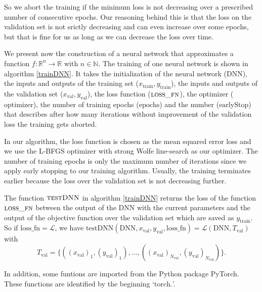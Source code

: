 So we abort the training if the minimum loss is not decreasing over a prescribed number of consecutive epochs. Our reasoning behind this is that the loss on the validation set is not srictly decreasing and can even increase over some epochs, but that is fine for us as long as we can decrease the loss over time.

We present now the construction of a neural network that approximates a function $f:\mathbb{R}^n\to\mathbb{R}$ with $n\in\mathbb{N}$. The training of one neural network is shown in algorithm \ref{trainDNN}. It takes the initialization of the neural network ($\mathrm{DNN}$), the inputs and outputs of the training set ($x_\mathrm{train}, y_\mathrm{train}$), the inputs and outputs of the validation set ($x_\mathrm{val}, y_\mathrm{val}$), the loss function ($\textproc{loss\_fn}$), the optimizer ($\mathrm{optimizer}$), the number of training epochs ($\mathrm{epochs}$) and the number ($\mathrm{earlyStop}$) that describes after how many iterations without improvement of the validation loss the training gets aborted.

In our algorithm, the loss function is chosen as the mean squared error loss and we use the L-BFGS optimizer with strong Wolfe line-search as our optimizer. The number of training epochs is only the maximum number of iterations since we apply early stopping to our training algorithm. Usually, the training terminates earlier because the loss over the validation set is not decreasing further.

The function $\textproc{testDNN}$ in algorithm \ref{trainDNN} returns the loss of the function $\textproc{loss\_fn}$ between the output of the DNN with the current parameters and the output of the objective function over the validation set which are saved as $y_\mathrm{train}$. So if $\mathrm{loss\_fn}=\mathscr{L}$, we have $\mathrm{testDNN}(\mathrm{DNN}, x_\mathrm{val}, y_\mathrm{val}, \mathrm{loss\_fn}) = \mathscr{L}(\mathrm{DNN}, T_\mathrm{val})$ with
\begin{displaymath}
T_\mathrm{val}=\{((x_\mathrm{val})_1,(y_\mathrm{val})_1),\dotsc,((x_\mathrm{val})_{N_\mathrm{val}},(y_\mathrm{val})_{N_\mathrm{val}})\}.
\end{displaymath}

In addition, some funtions are imported from the Python package PyTorch. These functions are identified by the beginning `$\mathrm{torch.}$'.

